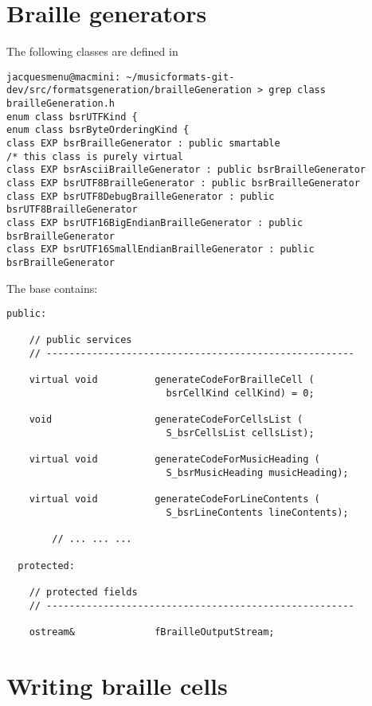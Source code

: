 \section{Braille generators}

The following classes are defined in 
\begin{lstlisting}[language=Terminal]
jacquesmenu@macmini: ~/musicformats-git-dev/src/formatsgeneration/brailleGeneration > grep class brailleGeneration.h
enum class bsrUTFKind {
enum class bsrByteOrderingKind {
class EXP bsrBrailleGenerator : public smartable
/* this class is purely virtual
class EXP bsrAsciiBrailleGenerator : public bsrBrailleGenerator
class EXP bsrUTF8BrailleGenerator : public bsrBrailleGenerator
class EXP bsrUTF8DebugBrailleGenerator : public bsrUTF8BrailleGenerator
class EXP bsrUTF16BigEndianBrailleGenerator : public bsrBrailleGenerator
class EXP bsrUTF16SmallEndianBrailleGenerator : public bsrBrailleGenerator
\end{lstlisting}

The base  contains:
\begin{lstlisting}[language=CPlusPlus]
  public:

    // public services
    // ------------------------------------------------------

    virtual void          generateCodeForBrailleCell (
                            bsrCellKind cellKind) = 0;

    void                  generateCodeForCellsList (
                            S_bsrCellsList cellsList);

    virtual void          generateCodeForMusicHeading (
                            S_bsrMusicHeading musicHeading);

    virtual void          generateCodeForLineContents (
                            S_bsrLineContents lineContents);

		// ... ... ...

  protected:

    // protected fields
    // ------------------------------------------------------

    ostream&              fBrailleOutputStream;
\end{lstlisting}


\section{Writing braille cells}

